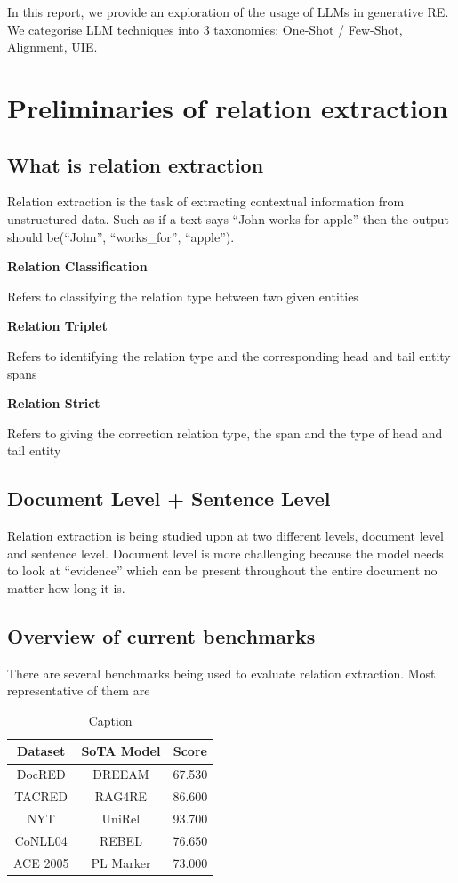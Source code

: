 \documentclass[twocolumn, 11pt]{extarticle}
\begin{document}
In this report, we provide an exploration of the usage of LLMs in generative RE. We categorise LLM techniques into 3 taxonomies: One-Shot / Few-Shot, Alignment, UIE. 


\section{Preliminaries of relation extraction }

\subsection{What is relation extraction}

Relation extraction is the task of extracting contextual information from unstructured data. Such as if a text says “John works for apple” then the output should be(“John”, “works\_for”, “apple”).

\textbf{Relation Classification}

Refers to classifying the relation type between two given entities

\textbf{Relation Triplet}

Refers to identifying the relation type and the corresponding head and tail entity spans

\textbf{Relation Strict}

Refers to giving the correction relation type, the span and the type of head and tail entity

 

\subsection{Document Level + Sentence Level}

Relation extraction is being studied upon at two different levels, document level and sentence level. Document level is more challenging because the model needs to look at “evidence” which can be present throughout the entire document no matter how long it is.  

\subsection{Overview of current benchmarks}


There are several benchmarks being used to evaluate relation extraction. Most representative of them are


\begin{table}
    \centering
    \begin{tabular}{|c|c|c|} \hline 
         Dataset&  SoTA Model& Score\\ \hline 
         DocRED&  DREEAM& 67.530\\ \hline 
         TACRED&  RAG4RE& 86.600\\ \hline 
         NYT&  UniRel& 93.700\\ \hline 
         CoNLL04&  REBEL& 76.650\\ \hline 
 ACE 2005& PL Marker&73.000\\ \hline
    \end{tabular}
    \caption{Caption}
    \label{Some benchmarks along with their current representative model}
\end{table}
\end{document}
